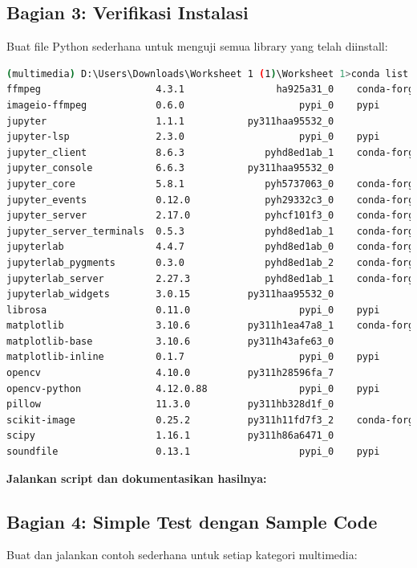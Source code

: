 \documentclass[11pt,a4paper]{article}
\begin{document}
\subsection{Bagian 3: Verifikasi Instalasi}
Buat file Python sederhana untuk menguji semua library yang telah diinstall:
\begin{lstlisting}[language=bash, caption = Verifikasi Versi Library yang Diinstal]
(multimedia) D:\Users\Downloads\Worksheet 1 (1)\Worksheet 1>conda list | findstr "librosa soundfile scipy opencv pillow scikit-image matplotlib ffmpeg jupyter"
ffmpeg                    4.3.1                ha925a31_0    conda-forge
imageio-ffmpeg            0.6.0                    pypi_0    pypi       
jupyter                   1.1.1           py311haa95532_0
jupyter-lsp               2.3.0                    pypi_0    pypi       
jupyter_client            8.6.3              pyhd8ed1ab_1    conda-forge
jupyter_console           6.6.3           py311haa95532_0
jupyter_core              5.8.1              pyh5737063_0    conda-forge
jupyter_events            0.12.0             pyh29332c3_0    conda-forge
jupyter_server            2.17.0             pyhcf101f3_0    conda-forge
jupyter_server_terminals  0.5.3              pyhd8ed1ab_1    conda-forge
jupyterlab                4.4.7              pyhd8ed1ab_0    conda-forge
jupyterlab_pygments       0.3.0              pyhd8ed1ab_2    conda-forge
jupyterlab_server         2.27.3             pyhd8ed1ab_1    conda-forge
jupyterlab_widgets        3.0.15          py311haa95532_0
librosa                   0.11.0                   pypi_0    pypi       
matplotlib                3.10.6          py311h1ea47a8_1    conda-forge
matplotlib-base           3.10.6          py311h43afe63_0
matplotlib-inline         0.1.7                    pypi_0    pypi
opencv                    4.10.0          py311h28596fa_7
opencv-python             4.12.0.88                pypi_0    pypi
pillow                    11.3.0          py311hb328d1f_0
scikit-image              0.25.2          py311h11fd7f3_2    conda-forge
scipy                     1.16.1          py311h86a6471_0
soundfile                 0.13.1                   pypi_0    pypi
\end{lstlisting}

\textbf{Jalankan script dan dokumentasikan hasilnya:}

\subsection{Bagian 4: Simple Test dengan Sample Code}
Buat dan jalankan contoh sederhana untuk setiap kategori multimedia:
\end{document}
